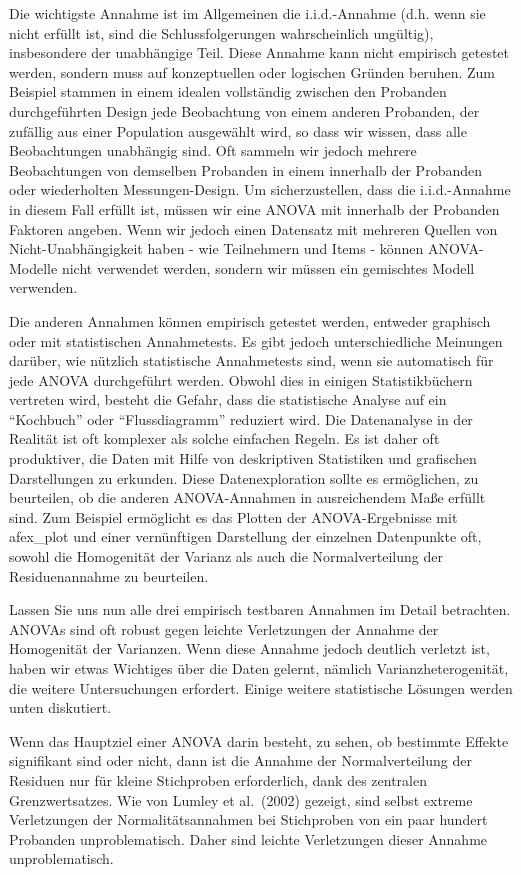 \documentclass[
]{book}
\begin{document}
Die wichtigste Annahme ist im Allgemeinen die i.i.d.-Annahme (d.h. wenn sie nicht erfüllt ist, sind die Schlussfolgerungen wahrscheinlich ungültig), insbesondere der unabhängige Teil. Diese Annahme kann nicht empirisch getestet werden, sondern muss auf konzeptuellen oder logischen Gründen beruhen. Zum Beispiel stammen in einem idealen vollständig zwischen den Probanden durchgeführten Design jede Beobachtung von einem anderen Probanden, der zufällig aus einer Population ausgewählt wird, so dass wir wissen, dass alle Beobachtungen unabhängig sind. Oft sammeln wir jedoch mehrere Beobachtungen von demselben Probanden in einem innerhalb der Probanden oder wiederholten Messungen-Design. Um sicherzustellen, dass die i.i.d.-Annahme in diesem Fall erfüllt ist, müssen wir eine ANOVA mit innerhalb der Probanden Faktoren angeben. Wenn wir jedoch einen Datensatz mit mehreren Quellen von Nicht-Unabhängigkeit haben - wie Teilnehmern und Items - können ANOVA-Modelle nicht verwendet werden, sondern wir müssen ein gemischtes Modell verwenden.

Die anderen Annahmen können empirisch getestet werden, entweder graphisch oder mit statistischen Annahmetests. Es gibt jedoch unterschiedliche Meinungen darüber, wie nützlich statistische Annahmetests sind, wenn sie automatisch für jede ANOVA durchgeführt werden. Obwohl dies in einigen Statistikbüchern vertreten wird, besteht die Gefahr, dass die statistische Analyse auf ein ``Kochbuch'' oder ``Flussdiagramm'' reduziert wird. Die Datenanalyse in der Realität ist oft komplexer als solche einfachen Regeln. Es ist daher oft produktiver, die Daten mit Hilfe von deskriptiven Statistiken und grafischen Darstellungen zu erkunden. Diese Datenexploration sollte es ermöglichen, zu beurteilen, ob die anderen ANOVA-Annahmen in ausreichendem Maße erfüllt sind. Zum Beispiel ermöglicht es das Plotten der ANOVA-Ergebnisse mit afex\_plot und einer vernünftigen Darstellung der einzelnen Datenpunkte oft, sowohl die Homogenität der Varianz als auch die Normalverteilung der Residuenannahme zu beurteilen.

Lassen Sie uns nun alle drei empirisch testbaren Annahmen im Detail betrachten. ANOVAs sind oft robust gegen leichte Verletzungen der Annahme der Homogenität der Varianzen. Wenn diese Annahme jedoch deutlich verletzt ist, haben wir etwas Wichtiges über die Daten gelernt, nämlich Varianzheterogenität, die weitere Untersuchungen erfordert. Einige weitere statistische Lösungen werden unten diskutiert.

Wenn das Hauptziel einer ANOVA darin besteht, zu sehen, ob bestimmte Effekte signifikant sind oder nicht, dann ist die Annahme der Normalverteilung der Residuen nur für kleine Stichproben erforderlich, dank des zentralen Grenzwertsatzes. Wie von Lumley et al.~(2002) gezeigt, sind selbst extreme Verletzungen der Normalitätsannahmen bei Stichproben von ein paar hundert Probanden unproblematisch. Daher sind leichte Verletzungen dieser Annahme unproblematisch.
\end{document}
